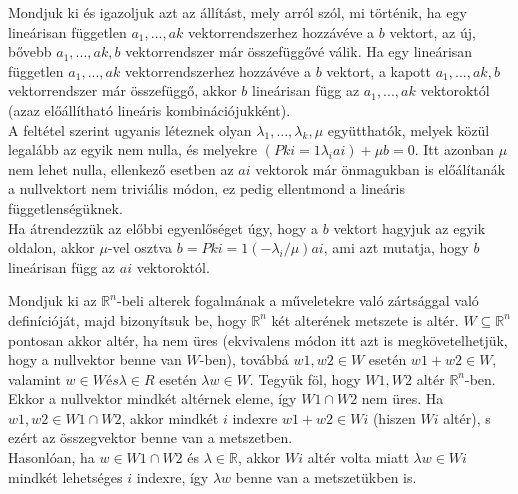 \begin{frame}
  \begin{tcolorbox}[title={3. (4p)}]
      Mondjuk ki és igazoljuk azt az állítást, mely arról szól, mi történik, ha egy lineárisan független $a_1,...,ak$ vektorrendszerhez hozzávéve a $b$ vektort, az új, bővebb $a_1,...,ak,b$ vektorrendszer már összefüggővé válik.
  \tcblower
    Ha egy lineárisan független $a_1,...,ak$ vektorrendszerhez hozzávéve a $b$ vektort, a kapott $a_1,...,ak,b$ vektorrendszer már összefüggő, akkor $b$ lineárisan függ az $a_1,...,ak$ vektoroktól (azaz előállítható lineáris kombinációjukként).\\
    
    A feltétel szerint ugyanis léteznek olyan ${\lambda}_1,...,{\lambda}_k,{\mu}$ együtthatók, melyek közül legalább az egyik nem nulla, és melyekre $(Pk i=1 {\lambda}_iai) + {\mu}b = 0$. Itt azonban ${\mu}$ nem lehet nulla, ellenkező esetben az $ai$ vektorok már önmagukban is előálítanák a nullvektort nem triviális módon, ez pedig ellentmond a lineáris függetlenségüknek.\\
    
    Ha átrendezzük az előbbi egyenlőséget úgy, hogy a $b$ vektort hagyjuk az egyik oldalon, akkor ${\mu}$-vel osztva $b = Pk i=1(-{\lambda}_i/{\mu})ai$, ami azt mutatja, hogy $b$ lineárisan függ az $ai$ vektoroktól.
  \end{tcolorbox}
\end{frame}

\begin{frame}
  \begin{tcolorbox}[title={4. (4p)}]
      Mondjuk ki az $\mathbb{R}^n$-beli alterek fogalmának a műveletekre való zártsággal való definícióját, majd bizonyítsuk be, hogy $\mathbb{R}^n$ két alterének metszete is altér.
  \tcblower
    $W {\subseteq} \mathbb{R}^n$ pontosan akkor altér, ha nem üres (ekvivalens módon itt azt is megkövetelhetjük, hogy a nullvektor benne van $W$-ben), továbbá $w1,w2 \in W$ esetén $w1 +w2 \in W$, valamint $w \in W és {\lambda} \in R$ esetén ${\lambda}w \in W$. Tegyük föl, hogy $W1,W2$ altér $\mathbb{R}^n$-ben.\\
    
    Ekkor a nullvektor mindkét altérnek eleme, így $W1 {\cap}W2$ nem üres. Ha $w1,w2 \in W1 {\cap}W2$, akkor mindkét $i$ indexre $w1 +w2 \in Wi$ (hiszen $Wi$ altér), s ezért az összegvektor benne van a metszetben.\\
    
    Hasonlóan, ha $w \in W1 {\cap} W2$ és ${\lambda} \in \mathbb{R}$, akkor $Wi$ altér volta miatt ${\lambda}w \in Wi$ mindkét lehetséges $i$ indexre, így ${\lambda}w$ benne van a metszetükben is.
  \end{tcolorbox}
\end{frame}


